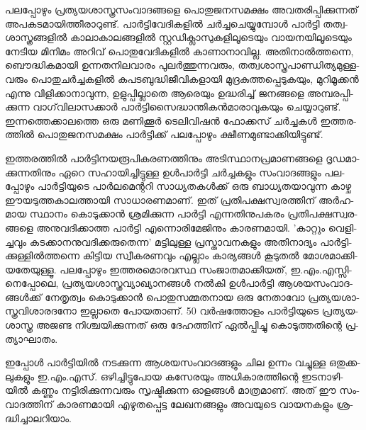 ­പ­ല­പ്പോ­ഴും പ്ര­ത്യ­യ­ശാ­സ്ത്ര­സം­വാ­ദ­ങ്ങ­ളെ പൊ­തു­ജ­ന­സ­മ­ക്ഷം അവ­ത­രി­പ്പി­ക്കു­ന്ന­ത് അപ­ക­ട­മാ­യി­ത്തീ­രാ­റു­ണ്ട്. 
പാര്‍­ട്ടി­വേ­ദി­ക­ളില്‍ ചര്‍­ച്ച­ചെ­യ്യു­മ്പോള്‍ പാര്‍­ട്ടി തത്വ­ശാ­സ്ത്ര­ങ്ങ­ളില്‍ കാ­ലാ­കാ­ല­ങ്ങ­ളില്‍ സ്റ്റ­ഡി­ക്ലാ­സു­ക­ളി­ലൂ­ടെ­യും 
വാ­യ­ന­യി­ലൂ­ടെ­യും നേ­ടിയ മി­നി­മം അറി­വ് പൊ­തു­വേ­ദി­ക­ളില്‍ കാ­ണാ­നാ­വി­ല്ല. അതി­നാല്‍­ത്ത­ന്നെ, ബൌ­ദ്ധി­ക­മാ­യി 
ഉന്ന­ത­നി­ല­വാ­രം പു­ലര്‍­ത്തു­ന്ന­വ­രും, തത്വ­ശാ­സ്ത്ര­പാ­ണ്ഡി­ത്യ­മു­ള്ള­വ­രും പൊ­തു­ചര്‍­ച്ച­ക­ളില്‍ കപ­ട­ബു­ദ്ധി­ജീ­വി­ക­ളാ­യി 
മു­ദ്ര­കു­ത്ത­പ്പെ­ടു­ക­യും, മു­റി­മൂ­ക്കന്‍ എന്നു വി­ളി­ക്കാ­നാ­വു­ന്ന, ഉളു­പ്പി­ല്ലാ­തെ ആരെ­യും ഉദ്ധ­രി­ച്ച് ജന­ങ്ങ­ളെ അമ്പ­ര­പ്പി­ക്കു­ന്ന 
വാ­ഗ്‌­വി­ലാ­സ­ക്കാര്‍ പാര്‍­ട്ടി­സൈ­ദ്ധാ­ന്തി­കന്‍­മാ­രാ­വു­ക­യും ചെ­യ്യാ­റു­ണ്ട്. ഇന്ന­ത്തെ­ക്കാ­ല­ത്തെ ഒരു മണി­ക്കൂര്‍ 
ടെ­ലി­വി­ഷന്‍ ഫോ­ക്ക­സ് ചര്‍­ച്ച­കള്‍ ഇത്ത­ര­ത്തില്‍ പൊ­തു­ജ­ന­സ­മ­ക്ഷം പാര്‍­ട്ടി­ക്ക് പല­പ്പോ­ഴും ക്ഷീ­ണ­മു­ണ്ടാ­ക്കി­യി­ട്ടു­ണ്ട്.

ഇ­ത്ത­ര­ത്തില്‍ പാര്‍­ട്ടി­ന­യ­രൂ­പി­ക­ര­ണ­ത്തി­നും അടി­സ്ഥാ­ന­പ്ര­മാ­ണ­ങ്ങ­ളെ ദൃ­ഡ­മാ­ക്കു­ന്ന­തി­നും ഏറെ സഹാ­യി­ച്ചി­ട്ടു­ള്ള 
ഉള്‍­പാര്‍­ട്ടി ചര്‍­ച്ച­ക­ളും സം­വാ­ദ­ങ്ങ­ളും പല­പ്പോ­ഴും പാര്‍­ട്ടി­യു­ടെ പാര്‍­ല­മെ­ന്റ­റി സാ­ധ്യ­ത­കള്‍­ക്ക് ഒരു ബാ­ധ്യ­ത­യാ­വു­ന്ന 
കാ­ഴ്ച ഈയ­ടു­ത്ത­കാ­ല­ത്താ­യി സാ­ധാ­ര­ണ­മാ­ണ്. ഇത് പ്ര­തി­പ­ക്ഷ­സ്വ­ര­ത്തി­ന് അര്‍­ഹ­മായ സ്ഥാ­നം കൊ­ടു­ക്കാന്‍ 
ശ്ര­മി­ക്കു­ന്ന പാര്‍­ട്ടി എന്ന­തി­നു­പ­ക­രം പ്ര­തി­പ­ക്ഷ­സ്വ­ര­ങ്ങ­ളെ അനു­വ­ദി­ക്കാ­ത്ത പാര്‍­ട്ടി എന്നൊ­രി­മേ­ജി­നും കാ­ര­ണ­മാ­യി. 
'കാ­റ്റും വെ­ളി­ച്ച­വും കട­ക്കാ­ന­നു­വ­ദി­ക്ക­രു­തെ­ന്ന' മട്ടി­ലു­ള്ള പ്ര­സ്താ­വ­ന­ക­ളും അതി­നാ­ദ്യം പാര്‍­ട്ടി­ക്കു­ള്ളില്‍­ത്ത­ന്നെ കി­ട്ടിയ 
സ്വീ­ക­ര­ണ­വും എല്ലാം കാ­ര്യ­ങ്ങള്‍ കൂ­ടു­തല്‍ മോ­ശ­മാ­ക്കി­യ­തേ­യു­ള്ളൂ. പല­പ്പോ­ഴും ഇത്ത­ര­മൊ­ര­വ­സ്ഥ സം­ജാ­ത­മാ­ക്കി­യ­ത്,
ഇ.എം­.എ­സ്സി­നെ­പ്പോ­ലെ, പ്ര­ത്യ­യ­ശാ­സ്ത്ര­വ്യാ­ഖ്യാ­ന­ങ്ങള്‍ നല്‍­കി ഉള്‍­പാര്‍­ട്ടി ആശ­യ­സം­വാ­ദ­ങ്ങള്‍­ക്ക് നേ­തൃ­ത്വം കൊ­ടു­ക്കാന്‍
പൊ­തു­സ­മ്മ­ത­നായ ഒരു നേ­താ­വോ പ്ര­ത്യ­യ­ശാ­സ്ത്ര­വി­ശാ­ര­ദ­നോ ഇല്ലാ­തെ പോ­യ­താ­ണ്. 50 വര്‍­ഷ­ത്തോ­ളം പാര്‍­ട്ടി­യു­ടെ 
പ്ര­ത്യ­യ­ശാ­സ്ത്ര അജ­ണ്ട നി­ശ്ച­യി­ക്കു­ന്ന­ത് ഒരു ദേ­ഹ­ത്തി­ന് ഏല്‍­പ്പി­ച്ചു കൊ­ടു­ത്ത­തി­ന്റെ പ്ര­ത്യാ­ഘാ­തം­.

ഇ­പ്പോള്‍ പാര്‍­ട്ടി­യില്‍ നട­ക്കു­ന്ന ആശ­യ­സം­വാ­ദ­ങ്ങ­ളും ചില ഉന്നം വച്ചു­ള്ള ഒതു­ക്ക­ലു­ക­ളും ഇ.എം­.എ­സ്. ഒഴി­ച്ചി­ട്ടു­പോയ 
കസേ­ര­യും അധി­കാ­ര­ത്തി­ന്റെ ഇട­നാ­ഴി­യില്‍ കണ്ണും നട്ടി­രി­ക്കു­ന്ന­വ­രും സൃ­ഷ്ടി­ക്കു­ന്ന ഓള­ങ്ങള്‍ മാ­ത്ര­മാ­ണ്. അത് ഈ 
സം­വാ­ദ­ത്തി­ന് കാ­ര­ണ­മാ­യി എഴു­ത­പ്പെ­ട്ട ലേ­ഖ­ന­ങ്ങ­ളും അവ­യു­ടെ വാ­യ­ന­ക­ളും ശ്ര­ദ്ധി­ച്ചാ­ല­റി­യാം­.

